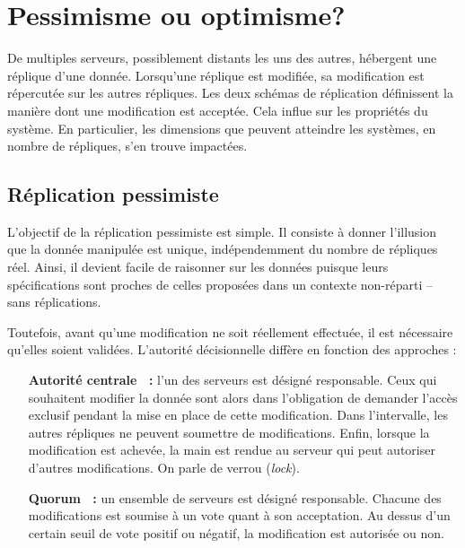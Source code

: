 
\section{Pessimisme ou optimisme?}
\label{repl:sec:schemas}

De multiples serveurs, possiblement distants les uns des autres, hébergent une
réplique d'une donnée. Lorsqu'une réplique est modifiée, sa modification est
répercutée sur les autres répliques. Les deux schémas de réplication définissent
la manière dont une modification est acceptée. Cela influe sur les propriétés du
système. En particulier, les dimensions que peuvent atteindre les systèmes, en
nombre de répliques, s'en trouve impactées.

\subsection{Réplication pessimiste}

L'objectif de la réplication pessimiste est simple. Il consiste à donner
l'illusion que la donnée manipulée est unique, indépendemment du nombre de
répliques réel. Ainsi, il devient facile de raisonner sur les données puisque
leurs spécifications sont proches de celles proposées dans un contexte
non-réparti -- sans réplications.

Toutefois, avant qu'une modification ne soit réellement effectuée, il est
nécessaire qu'elles soient validées. L'autorité décisionnelle diffère en fonction
des approches :
\begin{itemize}
\item [\textbf{Autorité centrale~\cite{alsberg1976principle} :}] l'un des
  serveurs est désigné responsable. Ceux qui souhaitent modifier la donnée sont
  alors dans l'obligation de demander l'accès exclusif pendant la mise en place
  de cette modification. Dans l'intervalle, les autres répliques ne peuvent
  soumettre de modifications. Enfin, lorsque la modification est achevée, la
  main est rendue au serveur qui peut autoriser d'autres modifications. On parle
  de verrou (\emph{lock}).
\item [\textbf{Quorum~\cite{gifford1979weighted} :}] un ensemble de serveurs est
  désigné responsable. Chacune des modifications est soumise à un vote quant à
  son acceptation. Au dessus d'un certain seuil de vote positif ou négatif, la
  modification est autorisée ou non.
\end{itemize}


